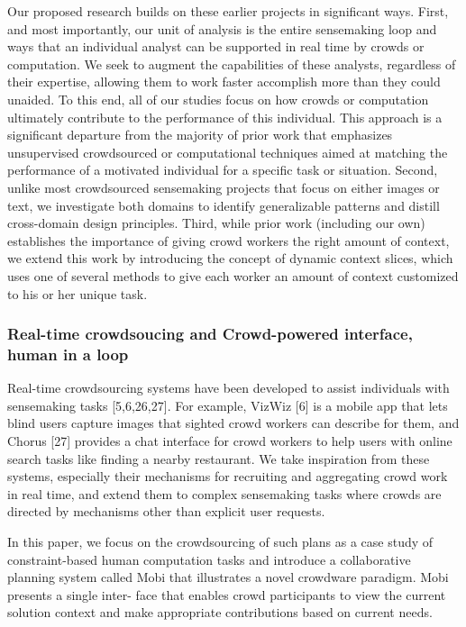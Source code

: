 \documentclass[journal]{vgtc}                %
\begin{document}
Our proposed research builds on these earlier projects in significant ways. First, and most importantly, our unit of analysis is the entire sensemaking loop and ways that an individual analyst can be supported in real time by crowds or computation. We seek to augment the capabilities of these analysts, regardless of their expertise, allowing them to work faster accomplish more than they could unaided. To this end, all of our studies focus on how crowds or computation ultimately contribute to the performance of this individual. This approach is a significant departure from the majority of prior work that emphasizes unsupervised crowdsourced or computational techniques aimed at matching the performance of a motivated individual for a specific task or situation. Second, unlike most crowdsourced sensemaking projects that focus on either images or text, we investigate both domains to identify generalizable patterns and distill cross-domain design principles. Third, while prior work (including our own) establishes the importance of giving crowd workers the right amount of context, we extend this work by introducing the concept of dynamic context slices, which uses one of several methods to give each worker an amount of context customized to his or her unique task.

\subsubsection{Real-time crowdsoucing and Crowd-powered interface, human in a loop}
Real-time crowdsourcing systems have been developed to assist individuals with sensemaking tasks [5,6,26,27]. For example, VizWiz [6] is a mobile app that lets blind users capture images that sighted crowd workers can describe for them, and Chorus [27] provides a chat interface for crowd workers to help users with online search tasks like finding a nearby restaurant. We take inspiration from these systems, especially their mechanisms for recruiting and aggregating crowd work in real time, and extend them to complex sensemaking tasks where crowds are directed by mechanisms other than explicit user requests.

In this paper, we focus on the crowdsourcing of such plans as a case study of constraint-based human computation tasks and introduce a collaborative planning system called Mobi that illustrates a novel crowdware paradigm. Mobi presents a single inter- face that enables crowd participants to view the current solution context and make appropriate contributions based on current needs.
\end{document}

